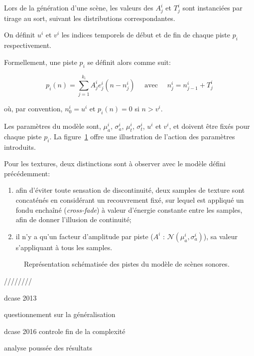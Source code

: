 Lors de la génération d'une scène, les valeurs des $A^i_j$ et $T_j^i$ sont instanciées par tirage au sort, suivant les distributions correspondantes.

On définit $u^i$ et $v^i$ les indices temporels de début et de fin de chaque piste $p_i$ respectivement.

Formellement, une piste $p_i$ se définit alors comme suit:

\begin{equation}
\label{eq:ch4_eq2}
p_{i}(n)= \sum_{j=1}^{k_i} A_j^i e_j^i(n-n_j^i) \quad \textrm{ avec } \quad n_j^i=n_{j-1}^i + T_j^i
\end{equation}

où, par convention, $n^i_0=u^i$ et $p_i(n)=0$ si $n>v^i$.

Les paramètres du modèle sont, $\mu_a^i$, $\sigma_a^i$, $\mu_t^i$, $\sigma_t^i$, $u^i$ et $v^i$, et doivent être fixés pour chaque piste $p_i$. La figure~\ref{fig:modelSequence} offre une illustration de l'action des paramètres introduits.

Pour les textures, deux distinctions sont à observer avec le modèle défini précédemment:

\begin{enumerate}
\item afin d'éviter toute sensation de discontinuité, deux samples de texture sont concaténés en considérant un recouvrement fixé, sur lequel est appliqué un fondu enchaîné (\emph{cross-fade}) à valeur d'énergie constante entre les samples, afin de donner l'illusion de continuité;
\item il n'y a qu'un facteur d'amplitude par piste ($A^i \textrm{ : } \mathcal{N}(\mu_a^{i},\sigma_a^{i})$), sa valeur s'appliquant à tous les samples.
\end{enumerate}

\begin{figure}[t]
        \graphicspath{{figures/}}
        \def\svgwidth{\linewidth}
        
       \caption{Représentation schématisée des pistes du modèle de scènes sonores.}\label{fig:modelSequence}
\end{figure}

////////

dcase 2013 \cite{stowellhal-01253912}

questionnement sur la généralisation \cite{lafayhal-01111381}

dcase 2016 controle fin de la complexité

analyse poussée des résultats \cite{lafayhal-01635414}

